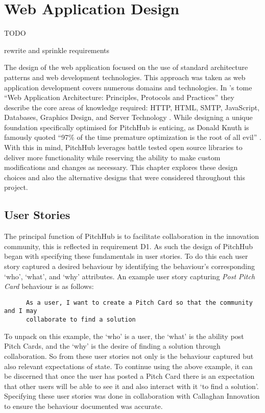 
\chapter{Web Application Design}\label{C:design_web}

TODO

rewrite and sprinkle requirements

The design of the web application focused on the use of standard architecture patterns and web development technologies. This approach was taken as web application development covers numerous domains and technologies. In \citeauthor{shklar2009web}'s tome ``Web Application Architecture: Principles, Protocols and Practices'' they describe the core areas of knowledge required: HTTP, HTML, SMTP, JavaScript, Databases, Graphics Design, and Server Technology \cite{shklar2009web}. While designing a unique foundation specifically optimised for PitchHub is enticing, as Donald Knuth is famously quoted ``97\% of the time premature optimization is the root of all evil'' \cite{knuth1974structured}. With this in mind, PitchHub leverages battle tested open source libraries to deliver more functionality while reserving the ability to make custom modifications and changes as necessary. This chapter explores these design choices and also the alternative designs that were considered throughout this project.

\section{User Stories}

The principal function of PitchHub is to facilitate collaboration in the innovation community, this is reflected in requirement D1. As such the design of PitchHub began with specifying these fundamentals in user stories. To do this each user story captured a desired behaviour by identifying the behaviour's corresponding `who', `what', and `why' attributes. An example user story capturing \textit{Post Pitch Card} behaviour is as follows:

\begin{verbatim}
	  As a user, I want to create a Pitch Card so that the community and I may 
	  collaborate to find a solution	
\end{verbatim}

To unpack on this example, the `who' is a user, the `what' is the ability post Pitch Cards, and the `why' is the desire of finding a solution through collaboration.
So from these user stories not only is the behaviour captured but also relevant expectations of state. To continue using the above example, it can be discerned that once the user has posted a Pitch Card there is an expectation that other users will be able to see it and also interact with it `to find a solution'. Specifying these user stories was done in collaboration with Callaghan Innovation to ensure the behaviour documented was accurate. 


